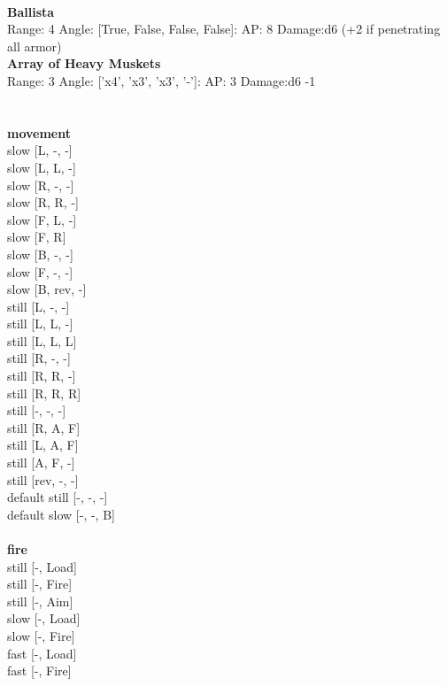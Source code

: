 \ \\
{\bf Ballista } \\



Range: 4  Angle: [True, False, False, False]: AP: 8 Damage:d6 (+2 if penetrating all armor) \\




{\bf Array of Heavy Muskets } \\



Range: 3  Angle: ['x4', 'x3', 'x3', '-']: AP: 3 Damage:d6 -1 \\




 
\ \\



\ \\ {\bf movement } \\
slow [L, -, -] \\
slow [L, L, -] \\
slow [R, -, -] \\
slow [R, R, -] \\
slow [F, L, -] \\
slow [F, R] \\
slow [B, -, -] \\
slow [F, -, -] \\
slow [B, rev, -] \\
still [L, -, -] \\
still [L, L, -] \\
still [L, L, L] \\
still [R, -, -] \\
still [R, R, -] \\
still [R, R, R] \\
still [-, -, -] \\
still [R, A, F] \\
still [L, A, F] \\
still [A, F, -] \\
still [rev, -, -] \\
default still [-, -, -] \\
default slow [-, -, B] \\
\ \\ {\bf fire } \\
still [-, Load] \\
still [-, Fire] \\
still [-, Aim] \\
slow [-, Load] \\
slow [-, Fire] \\
fast [-, Load] \\
fast [-, Fire] \\


